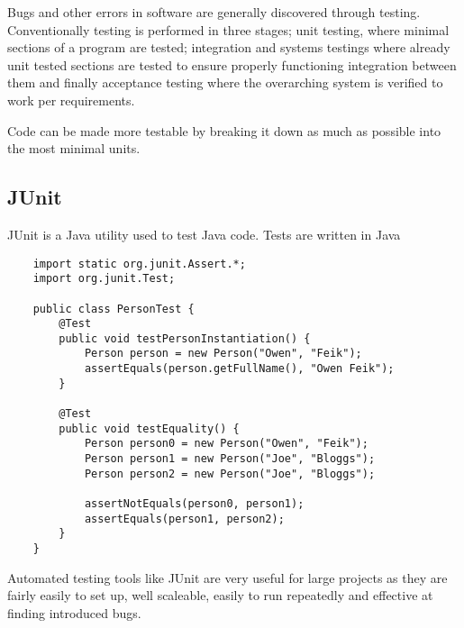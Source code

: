 \documentclass[12pt]{report}
\begin{document}
\begin{flushleft}
Bugs and other errors in software are generally discovered through testing.
Conventionally testing is performed in three stages; unit testing, where
minimal sections of a program are tested; integration and systems testings
where already unit tested sections are tested to ensure properly functioning
integration between them and finally acceptance testing where the overarching
system is verified to work per requirements. \par
Code can be made more testable by breaking it down as much as possible into the
most minimal units.

\subsection*{JUnit}

JUnit is a Java utility used to test Java code. Tests are written in Java 

\begin{lstlisting}
    import static org.junit.Assert.*;
    import org.junit.Test;
    
    public class PersonTest {
        @Test
        public void testPersonInstantiation() {
            Person person = new Person("Owen", "Feik");
            assertEquals(person.getFullName(), "Owen Feik");
        }

        @Test
        public void testEquality() {
            Person person0 = new Person("Owen", "Feik");
            Person person1 = new Person("Joe", "Bloggs");
            Person person2 = new Person("Joe", "Bloggs");

            assertNotEquals(person0, person1);
            assertEquals(person1, person2);
        }
    }
\end{lstlisting}

Automated testing tools like JUnit are very useful for large projects as they
are fairly easily to set up, well scaleable, easily to run repeatedly and
effective at finding introduced bugs.

\end{flushleft}
\end{document}
